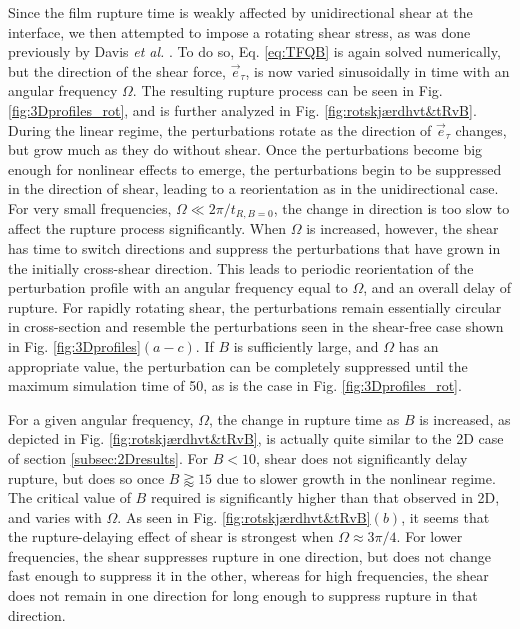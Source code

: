 \documentclass[
 onecolumn,
 amsmath,amssymb,
floatfix,superscriptaddress
]{revtex4-2}
\begin{document}
Since the film rupture time is weakly affected by unidirectional shear at the interface, we then attempted to impose a rotating shear stress, as was done previously by Davis \textit{et al.} \cite{davis_gratton_davis_2010}. To do so, Eq. \eqref{eq:TFQB} is again solved numerically, but the direction of the shear force, $\overrightarrow{e}_\tau$, is now varied sinusoidally in time with an angular frequency $\Omega$. The resulting rupture process can be seen in Fig. \ref{fig:3Dprofiles_rot}, and is further analyzed in Fig. \ref{fig:rotskjærdhvt&tRvB}. During the linear regime, the perturbations rotate as the direction of $\overrightarrow{e}_\tau$ changes, but grow much as they do without shear. Once the perturbations become big enough for nonlinear effects to emerge, the perturbations begin to be suppressed in the direction of shear, leading to a reorientation as in the unidirectional case. For very  small frequencies, $\Omega \ll 2\pi /t_{R,B=0}$, the change in direction is too slow to affect the rupture process significantly. When $\Omega$ is increased, however, the shear has time to switch directions and suppress the perturbations that have grown in the initially cross-shear direction. This leads to periodic reorientation of the perturbation profile with an angular frequency equal to $\Omega$, and an overall delay of rupture. For rapidly rotating shear, the perturbations remain essentially circular in cross-section and resemble the perturbations seen in the shear-free case shown in Fig. \ref{fig:3Dprofiles}$(a-c)$. If $B$ is sufficiently large, and $\Omega$ has an appropriate value, the perturbation can be completely suppressed until the maximum simulation time of 50, as is the case in Fig. \ref{fig:3Dprofiles_rot}.

For a given angular frequency, $\Omega$, the change in rupture time as $B$ is increased, as depicted in Fig. \ref{fig:rotskjærdhvt&tRvB}, is actually quite similar to the 2D case of section \ref{subsec:2Dresults}. For $B<10$, shear does not significantly delay rupture, but does so once $B\gtrapprox 15$ due to slower growth in the nonlinear regime. The critical value of $B$ required is significantly higher than that observed in 2D, and varies with $\Omega$. As seen in Fig. \ref{fig:rotskjærdhvt&tRvB}$(b)$, it seems that the rupture-delaying effect of shear is strongest when $\Omega \approx 3\pi/4$. For lower frequencies, the shear suppresses rupture in one direction, but does not change fast enough to suppress it in the other, whereas for high frequencies, the shear does not remain in one direction for long enough to suppress rupture in that direction.
\end{document}
